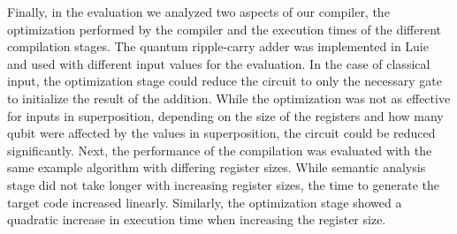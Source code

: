 Finally, in the evaluation we analyzed two aspects of our compiler, the optimization performed by the compiler and the execution times of the different compilation stages. The quantum ripple-carry adder was implemented in Luie and used with different input values for the evaluation. In the case of classical input, the optimization stage could reduce the circuit to only the necessary gate to initialize the result of the addition. While the optimization was not as effective for inputs in superposition, depending on the size of the registers and how many qubit were affected by the values in superposition, the circuit could be reduced significantly. Next, the performance of the compilation was evaluated with the same example algorithm with differing register sizes. While semantic analysis stage did not take longer with increasing register sizes, the time to generate the target code increased linearly. Similarly, the optimization stage showed a quadratic increase in execution time when increasing the register size.    